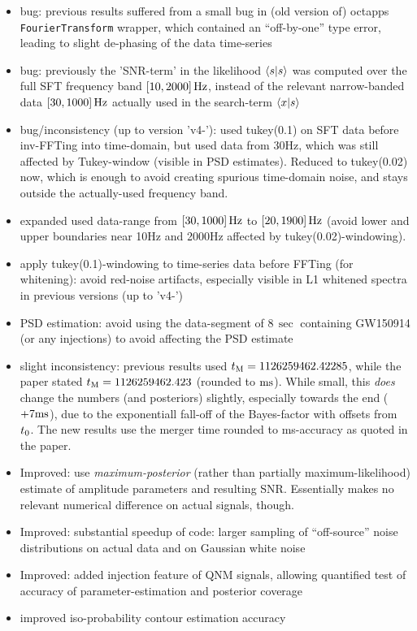 \documentclass[aps,prd,onecolumn,notitlepage,nofootinbib,superscriptaddress,altaffilletter,floatfix]{revtex4-1}
\begin{document}
\begin{itemize}
\item bug: previous results suffered from a small bug in (old version of) octapps \texttt{FourierTransform} wrapper, which contained an ``off-by-one'' type
  error, leading to slight de-phasing of the data time-series

\item bug: previously the 'SNR-term' in the likelihood $\langle s|s\rangle$ was computed over the full SFT frequency band $[10,2000]\,\mathrm{Hz}$, instead of
  the relevant narrow-banded data $[30,1000]\,\mathrm{Hz}$ actually used in the search-term $\langle x|s\rangle$

\item bug/inconsistency (up to version 'v4-'): used tukey(0.1) on SFT data before inv-FFTing into time-domain, but used data from 30Hz, which was
  still affected by Tukey-window (visible in PSD estimates). Reduced to tukey(0.02) now, which is enough to avoid creating spurious time-domain noise,
  and stays outside the actually-used frequency band.

\item expanded used data-range from ${[30,1000]}\,\mathrm{Hz}$ to ${[20,1900]}\,\mathrm{Hz}$ (avoid lower and upper boundaries near 10Hz and 2000Hz affected by tukey(0.02)-windowing).

\item apply tukey(0.1)-windowing to time-series data before FFTing (for whitening): avoid red-noise artifacts, especially visible in L1 whitened
  spectra in previous versions (up to 'v4-')

\item PSD estimation: avoid using the data-segment of $8\,\sec$ containing GW150914 (or any injections) to avoid affecting the PSD estimate

\item slight inconsistency: previous results used  $t_{\mathrm{M}} = 1126259462.42285$, while the paper stated  $t_{\mathrm{M}} = 1126259462.423$
  (rounded to $\mathrm{ms}$). While small, this \emph{does} change the numbers (and posteriors) slightly, especially towards the end ($+7\mathrm{ms}$), due to the
  exponentiall fall-off of the Bayes-factor with offsets from $t_0$. The new results use the merger time rounded to ms-accuracy as quoted in the
  paper.

\item Improved: use \emph{maximum-posterior} (rather than partially maximum-likelihood) estimate of amplitude parameters and resulting SNR. Essentially
  makes no relevant numerical difference on actual signals, though.

\item Improved: substantial speedup of code: larger sampling of ``off-source'' noise distributions on actual data and on Gaussian white noise

\item Improved: added injection feature of QNM signals, allowing quantified test of accuracy of parameter-estimation and posterior coverage

\item improved iso-probability contour estimation accuracy

\end{itemize}
\end{document}
